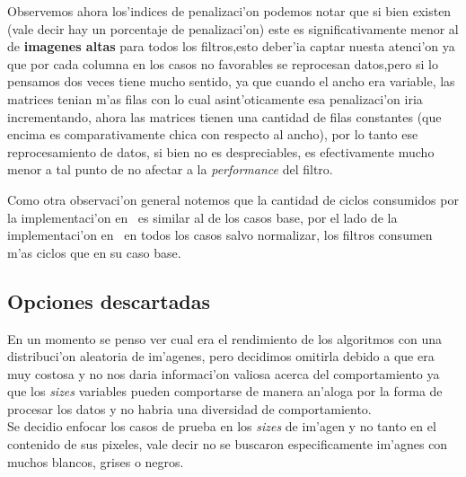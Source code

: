 Observemos ahora los'indices de penalizaci'on podemos notar que si bien existen (vale decir hay un porcentaje
 de penalizaci'on) este es significativamente menor al de \textbf{imagenes altas} para todos los filtros,esto
deber'ia captar nuesta atenci'on ya que por cada columna en los casos no favorables se reprocesan datos,pero
si lo pensamos dos veces tiene mucho sentido, ya que cuando el ancho era variable, las matrices
tenian m'as filas con lo cual asint'oticamente esa penalizaci'on iria incrementando, ahora las matrices
tienen una cantidad de filas constantes (que encima es comparativamente chica con respecto al ancho),
por lo tanto ese reprocesamiento de datos, si bien no es despreciables, es efectivamente mucho menor
a tal punto de no afectar a la \textit{performance} del filtro.

Como otra observaci'on general notemos que la cantidad de ciclos consumidos por la implementaci'on en \C \ es
similar al de los casos base, por el lado de la implementaci'on en \ass \ en todos los casos salvo normalizar,
los filtros consumen m'as ciclos que en su caso base.

\subsection{Opciones descartadas}
En un momento se penso ver cual era el rendimiento de los algoritmos con una distribuci'on 
aleatoria de im'agenes, pero decidimos omitirla debido a que era muy costosa y no nos 
daria informaci'on valiosa acerca del comportamiento ya que los \textit{sizes} variables pueden comportarse 
de manera an'aloga por la forma de procesar los datos y no habria una diversidad de comportamiento.\\
Se decidio enfocar los casos de prueba en los \textit{sizes} de im'agen y no tanto en el contenido de 
sus pixeles, vale decir no se buscaron especificamente im'agnes con muchos blancos, grises o negros.   


